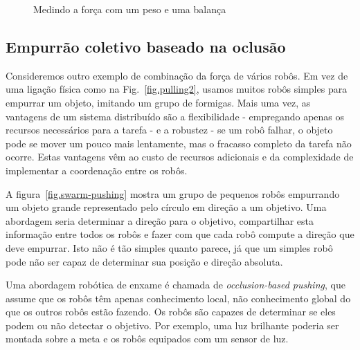 \begin{figure}
\begin{center}
\caption{Medindo a força com um peso e uma balança}\label{fig.scale}
\end{center}
\end{figure}

\subsection{Empurrão coletivo baseado na oclusão}

Consideremos outro exemplo de combinação da força de vários robôs. Em vez de uma ligação física como na Fig.~\ref{fig.pulling2}, usamos muitos robôs simples para empurrar um objeto, imitando um grupo de formigas. Mais uma vez, as vantagens de um sistema distribuído são a flexibilidade - empregando apenas os recursos necessários para a tarefa - e a robustez - se um robô falhar, o objeto pode se mover um pouco mais lentamente, mas o fracasso completo da tarefa não ocorre. Estas vantagens vêm ao custo de recursos adicionais e da complexidade de implementar a coordenação entre os robôs.

A figura~\ref{fig.swarm-pushing} mostra um grupo de pequenos robôs empurrando um objeto grande representado pelo círculo em direção a um objetivo. Uma abordagem seria determinar a direção para o objetivo, compartilhar esta informação entre todos os robôs e fazer com que cada robô compute a direção que deve empurrar. Isto não é tão simples quanto parece, já que um simples robô pode não ser capaz de determinar sua posição e direção absoluta.

Uma abordagem robótica de enxame é chamada de \emph{occlusion-based pushing}, que assume que os robôs têm apenas conhecimento local, não conhecimento global do que os outros robôs estão fazendo. Os robôs são capazes de determinar se eles podem ou não detectar o objetivo. Por exemplo, uma luz brilhante poderia ser montada sobre a meta e os robôs equipados com um sensor de luz. 

